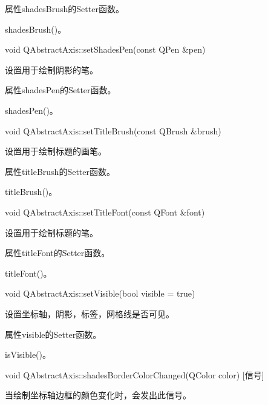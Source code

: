 \begin{notice}
属性shadesBrush的Setter函数。
\end{notice}
         
\begin{notice}[另请参阅]
shadesBrush()。
\end{notice}
    

void QAbstractAxis::setShadesPen(const QPen \&pen)

设置用于绘制阴影的笔。 

\begin{notice}
属性shadesPen的Setter函数。
\end{notice}
             
\begin{notice}[另请参阅]
shadesPen()。
\end{notice}

void QAbstractAxis::setTitleBrush(const QBrush \&brush) 

设置用于绘制标题的画笔。

\begin{notice}
属性titleBrush的Setter函数。
\end{notice}
    
\begin{notice}[另请参阅]
titleBrush()。
\end{notice}

void QAbstractAxis::setTitleFont(const QFont \&font) 

设置用于绘制标题的笔。

\begin{notice}
属性titleFont的Setter函数。
\end{notice}
        
\begin{notice}[另请参阅]
titleFont()。
\end{notice}

void QAbstractAxis::setVisible(bool visible = true) 

设置坐标轴，阴影，标签，网格线是否可见。 

\begin{notice}
属性visible的Setter函数。
\end{notice}
            
\begin{notice}[另请参阅]
isVisible()。
\end{notice}

void QAbstractAxis::shadesBorderColorChanged(QColor color) [信号] 

当绘制坐标轴边框的颜色变化时，会发出此信号。  

